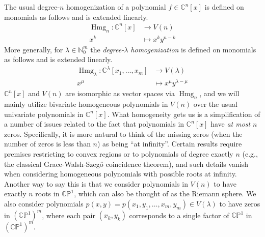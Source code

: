 \documentclass{article}
\theoremstyle{definition}
\theoremstyle{plain}
\newcommand{\C}{\mathbb{C}}
\newcommand{\N}{\mathbb{N}}
\newcommand{\CP}{\mathbb{CP}}
\DeclareMathOperator{\Hmg}{Hmg}
\begin{document}
The usual degree-$n$ homogenization of a polynomial $f \in \C^n[x]$ is defined on monomials as follows and is extended linearly.
\[
    \begin{split}
        \Hmg_n : \C^n[x] &\rightarrow V(n) \\
        x^k &\mapsto x^ky^{n-k}
    \end{split}
\]
More generally, for $\lambda \in \N_0^m$ the \emph{degree-$\lambda$ homogenization} is defined on monomials as follows and is extended linearly.
\[
    \begin{split}
        \Hmg_\lambda: \C^\lambda[x_1,\ldots,x_m] &\rightarrow V(\lambda)\\
        x^{\mu} &\mapsto x^{\mu}y^{\lambda-\mu}
    \end{split}
\]
$\C^n[x]$ and $V(n)$ are isomorphic as vector spaces via $\Hmg_n$, and we will mainly utilize bivariate homogeneous polynomials in $V(n)$ over the usual univariate polynomials in $\C^n[x]$.
%
%
What homogeneity gets us is a simplification of a number of issues related to the fact that polynomials in $\C^n[x]$ have \emph{at most} $n$ zeros. Specifically, it is more natural to think of the missing zeros (when the number of zeros is less than $n$) as being ``at infinity''. Certain results require premises restricting to convex regions or to polynomials of degree exactly $n$ (e.g., the classical Grace-Walsh-Szeg{\H{o}} coincidence theorem), and such details vanish when considering homogeneous polynomials with possible roots at infinity. Another way to say this is that we consider polynomials in $V(n)$ to have exactly $n$ roots in $\CP^1$, which can also be thought of as the Riemann sphere. We also consider polynomials $p(x,y) = p(x_1,y_1,\ldots,x_m,y_m) \in V(\lambda)$ to have zeros in $(\CP^1)^m$, where each pair $(x_k,y_k)$ corresponds to a single factor of $\CP^1$ in $(\CP^1)^m$.
\end{document}
